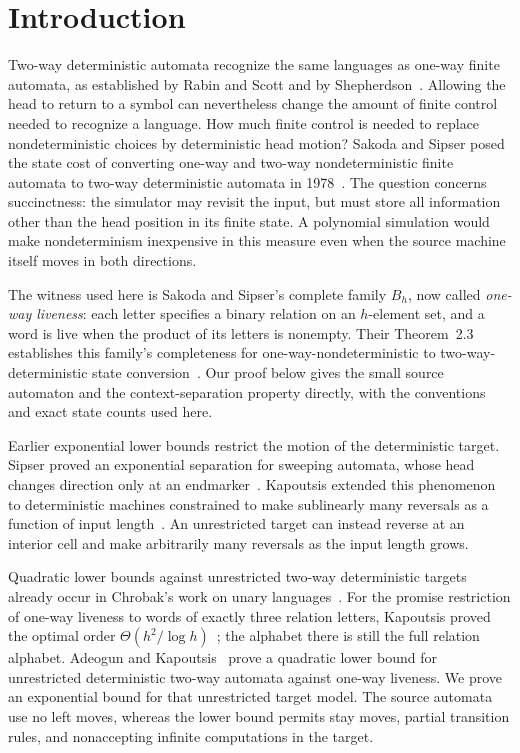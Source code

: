 \section{Introduction}

Two-way deterministic automata recognize the same languages as one-way
finite automata, as established by Rabin and Scott and by
Shepherdson~\cite{RabinScott1959,Shepherdson1959}. Allowing the head to
return to a symbol can nevertheless change the amount of finite control
needed to recognize a language. How much finite control is needed to
replace nondeterministic choices by deterministic head motion?
Sakoda and Sipser posed the state cost of converting one-way and two-way
nondeterministic finite automata to two-way deterministic automata in
1978~\cite{SakodaSipser1978}.
The question concerns succinctness: the simulator may revisit the input,
but must store all information other than the head position in its finite
state. A polynomial simulation would make nondeterminism inexpensive in
this measure even when the source machine itself moves in both directions.

The witness used here is Sakoda and Sipser's complete family $B_h$,
now called \emph{one-way liveness}: each letter specifies a binary
relation on an $h$-element set, and a word is live when the product of
its letters is nonempty.
Their Theorem~2.3 establishes this family's completeness for
one-way-nondeterministic to two-way-deterministic state
conversion~\cite{SakodaSipser1978}. Our proof below gives the small
source automaton and the context-separation property directly, with
the conventions and exact state counts used here.

Earlier exponential lower bounds restrict the motion of the deterministic
target. Sipser proved an exponential separation for sweeping automata,
whose head changes direction only at an endmarker~\cite{Sipser1980}.
Kapoutsis extended this phenomenon to deterministic machines constrained
to make sublinearly many reversals as a function of input
length~\cite{Kapoutsis2013}. An unrestricted
target can instead reverse at an interior cell and make arbitrarily many
reversals as the input length grows.

Quadratic lower bounds against unrestricted two-way deterministic targets
already occur in Chrobak's work on unary
languages~\cite{Chrobak1986Unary,Chrobak2003Errata}. For the promise restriction of
one-way liveness to words of exactly three relation letters, Kapoutsis
proved the optimal order $\Theta(h^2/\log h)$~\cite{Kapoutsis2018ShortLiveness};
the alphabet there is still the full relation alphabet. Adeogun and
Kapoutsis~\cite{AdeogunKapoutsis2026} prove a quadratic lower bound for
unrestricted deterministic two-way automata against one-way liveness.
We prove an exponential bound for that unrestricted target model.
The source automata use no left moves, whereas the lower bound permits
stay moves, partial transition rules, and nonaccepting infinite
computations in the target.

